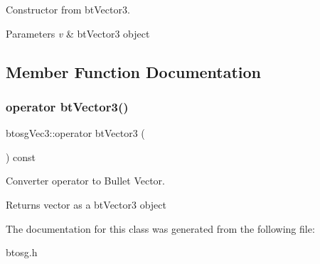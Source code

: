 Constructor from bt\+Vector3. 


\begin{DoxyParams}{Parameters}
{\em v} & bt\+Vector3 object \\
\hline
\end{DoxyParams}


\subsection{Member Function Documentation}
\mbox{\label{classbtosgVec3_a8e9e5bea1a46ba76e213a3f6e5e14dba}} 
\subsubsection{\texorpdfstring{operator bt\+Vector3()}{operator btVector3()}}
{\footnotesize\ttfamily btosg\+Vec3\+::operator bt\+Vector3 (\begin{DoxyParamCaption}{ }\end{DoxyParamCaption}) const\hspace{0.3cm}{\ttfamily [inline]}}



Converter operator to Bullet Vector. 

Returns vector as a bt\+Vector3 object 

The documentation for this class was generated from the following file\+:\begin{DoxyCompactItemize}
\item 
btosg.\+h\end{DoxyCompactItemize}
